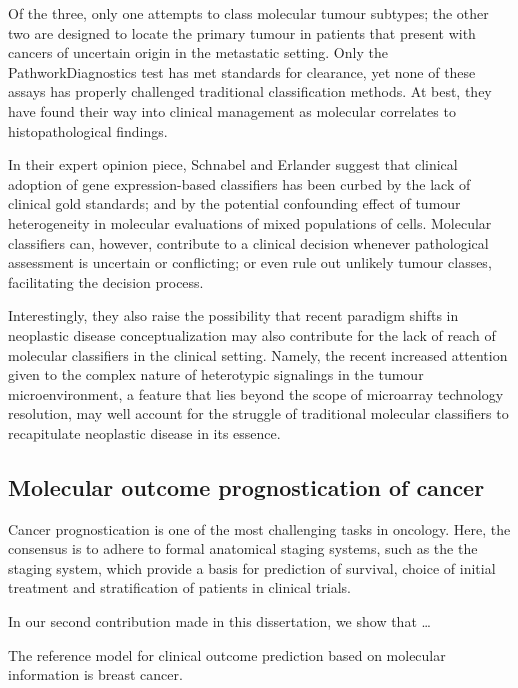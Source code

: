 Of the three, only one attempts to class molecular tumour subtypes; the other
two are designed to locate the primary tumour in patients that present with
cancers of uncertain origin in the metastatic setting.  Only the
PathworkDiagnostics\textregistered{} test has met standards for 
clearance, yet none of these assays has properly challenged traditional
classification methods.  At best, they have found their way into clinical
management as molecular correlates to histopathological findings.

In their expert opinion piece, Schnabel and Erlander suggest that clinical
adoption of gene expression-based classifiers has been curbed by the lack of
clinical gold standards; and by the potential confounding effect of tumour
heterogeneity in molecular evaluations of mixed populations of cells.  Molecular
classifiers can, however, contribute to a clinical decision whenever
pathological assessment is uncertain or conflicting; or even rule out unlikely
tumour classes, facilitating the decision process.

Interestingly, they also raise the possibility that recent paradigm shifts in
neoplastic disease conceptualization may also contribute for the lack of reach
of molecular classifiers in the clinical setting.  Namely, the recent increased
attention given to the complex nature of heterotypic signalings in the tumour
microenvironment,\cite{weigelt_need_2014} a feature that lies beyond the scope
of microarray technology resolution, may well account for the struggle of
traditional molecular classifiers to recapitulate neoplastic disease in its
essence.

\subsection{Molecular outcome prognostication of cancer}
\label{sec:molecular-prediction}

Cancer prognostication is one of the most challenging tasks in oncology.  Here,
the consensus is to adhere to formal anatomical staging systems, such as the the
 staging system,\cite{sobin_tnm:_2003} which provide a basis for
prediction of survival, choice of initial treatment and stratification of
patients in clinical trials.\cite{ludwig_biomarkers_2005}

\clearpage

In our second contribution made in this dissertation, we show that \ldots

The reference model for clinical outcome prediction based on molecular
information is breast cancer.

